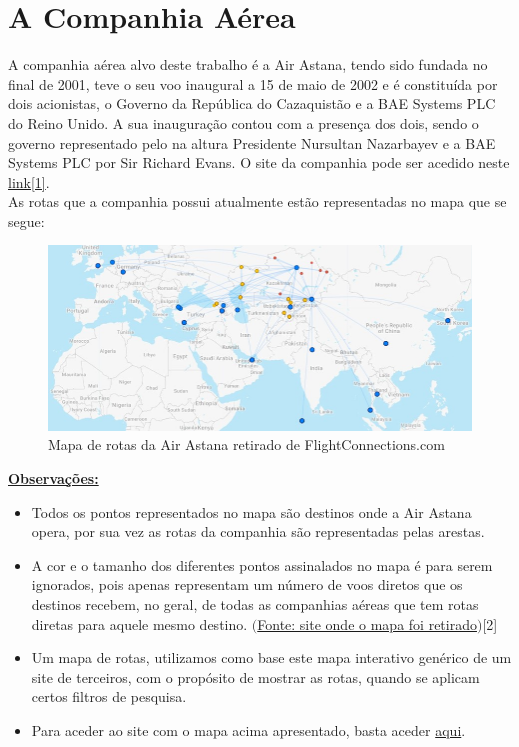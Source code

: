 \chapter{A Companhia Aérea}
\label{chapter:Companhia Aérea}
A companhia aérea alvo deste trabalho é a Air Astana, tendo sido fundada no final de 2001, teve o seu voo inaugural a 15 de maio de 2002 e é constituída por dois acionistas, o Governo da República do Cazaquistão e a BAE Systems PLC do Reino Unido.
A sua inauguração contou com a presença dos dois, sendo o governo representado pelo na altura Presidente Nursultan Nazarbayev e a BAE Systems PLC por Sir Richard Evans.
O site da companhia pode ser acedido neste \href{https://airastana.com/global/en-us}{link[1]}.\\
\indent As rotas que a companhia possui atualmente estão representadas no mapa que se segue:

\begin{figure}[h]
        \centering
        \includegraphics[width=1\textwidth]{imgs/Figura1}
        \caption{Mapa de rotas da Air Astana retirado de FlightConnections.com\label{fig:imagem1}}
\end{figure}

\noindent\underline{\textbf{Observações:}}\\
\begin{itemize}
\item Todos os pontos representados no mapa são destinos onde a Air Astana opera, por sua vez as rotas da
companhia são representadas pelas arestas.
\item A cor e o tamanho dos diferentes pontos assinalados no mapa é para serem ignorados, pois apenas
representam um número de voos diretos que os destinos recebem, no geral, de todas as companhias aéreas 
que tem rotas diretas para aquele mesmo destino. \href{https://www.flightconnections.com}{$($Fonte: site onde o mapa foi retirado$)$}[2]

\item Um mapa de rotas, utilizamos como base este mapa interativo genérico de um site de terceiros, com o
propósito de mostrar as rotas, quando se aplicam certos filtros de pesquisa.
\item Para aceder ao site com o mapa acima apresentado, basta aceder \href{https://www.flightconnections.com/route-map-air-astana-kc}{aqui}.
\end{itemize}
\clearpage
